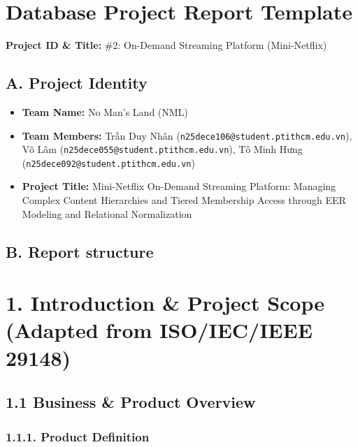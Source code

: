 \section*{Database Project Report Template}

\textbf{Project ID \& Title:} \#2: On-Demand Streaming Platform (Mini-Netflix)

\subsection*{A. Project Identity}

\begin{itemize}
\item
  \textbf{Team Name:} No Man's Land (NML)
\end{itemize}

\begin{itemize}
\item
  \textbf{Team Members:} Trần Duy Nhân (\nolinkurl{n25dece106@student.ptithcm.edu.vn}), Võ Lâm (\nolinkurl{n25dece055@student.ptithcm.edu.vn}), Tô Minh Hưng (\nolinkurl{n25dece092@student.ptithcm.edu.vn})
\end{itemize}

\begin{itemize}
\item
  \textbf{Project Title:} Mini-Netflix On-Demand Streaming Platform: Managing Complex Content Hierarchies and Tiered Membership Access through EER Modeling and Relational Normalization
\end{itemize}

\subsection*{B. Report structure}

\section*{1. Introduction \& Project Scope (Adapted from ISO/IEC/IEEE 29148)}

\subsection*{1.1 Business \& Product Overview}

\subsubsection*{1.1.1. Product Definition}

